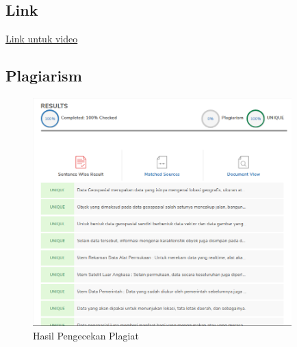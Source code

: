\subsection{Link}
\href{https://youtu.be/viGqu3ZHS_E}{Link untuk video}
\subsection{Plagiarism}
\begin{figure}[H]
	\includegraphics[width=10cm]{figures/1174035/tugas1/plagiat.png}
	\centering
	\caption{Hasil Pengecekan Plagiat}
\end{figure}

